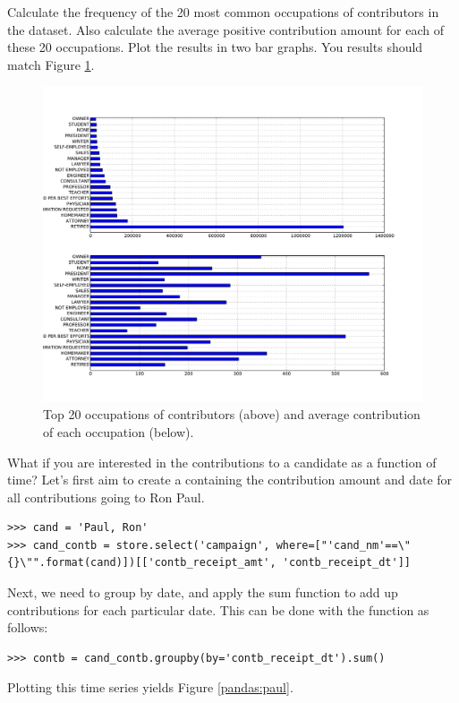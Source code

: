 \begin{problem}
Calculate the frequency of the 20 most common occupations of contributors in the dataset. 
Also calculate the average positive contribution amount for each of these 20 occupations.
Plot the results in two bar graphs. You results should match Figure \ref{pandas:occupation}.
\end{problem}

\begin{figure}
\centering
\includegraphics[width=\textwidth]{occupation.pdf}
\caption{Top 20 occupations of contributors (above) and average contribution of each
occupation (below).}
\label{pandas:occupation}
\end{figure}

What if you are interested in the contributions to a candidate as a function of time?
Let's first aim to create a  containing the contribution amount and date for
all contributions going to Ron Paul.
\begin{lstlisting}
>>> cand = 'Paul, Ron'
>>> cand_contb = store.select('campaign', where=["'cand_nm'==\"{}\"".format(cand)])[['contb_receipt_amt', 'contb_receipt_dt']]
\end{lstlisting}
Next, we need to group by date, and apply the sum function to add up contributions for each particular date.
This can be done with the  function as follows:
\begin{lstlisting}
>>> contb = cand_contb.groupby(by='contb_receipt_dt').sum()
\end{lstlisting}
Plotting this time series yields Figure \ref{pandas:paul}.

